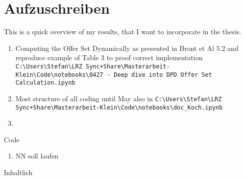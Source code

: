 \chapter{Aufzuschreiben}

This is a quick overview of my results, that I want to incorporate in the thesis.

\begin{enumerate}
	\item Computing the Offer Set Dynamically as presented in Bront et Al 5.2 and reproduce example of Table 3 to proof correct implementation \texttt{C:\textbackslash  Users\textbackslash  Stefan\textbackslash  LRZ Sync+Share\textbackslash  Masterarbeit-Klein\textbackslash  Code\textbackslash  notebooks\textbackslash  0427 - Deep dive into DPD Offer Set Calculation.ipynb}
	\item Most structure of all coding until May also in \texttt{C:\textbackslash  Users\textbackslash  Stefan\textbackslash  LRZ Sync+Share\textbackslash  Masterarbeit-Klein\textbackslash  Code\textbackslash  notebooks\textbackslash  doc\_Koch.ipynb}
\item \end{enumerate}

\newpage

Code
\begin{enumerate}
	\item NN soll laufen
\end{enumerate}

Inhaltlich

